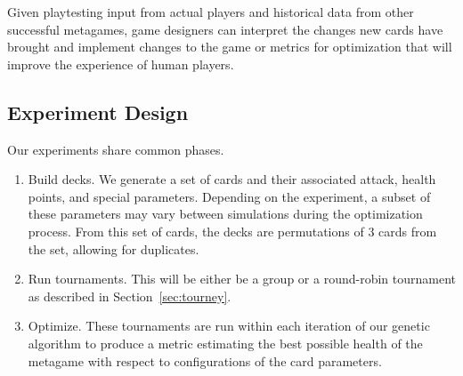 Given playtesting input from actual players and historical data from other successful metagames, game designers can interpret the %
changes new cards have brought and implement changes to the game or metrics for optimization that will improve the experience of human players.

\subsection{Experiment Design}


Our experiments share common phases.

\begin{enumerate}
	\item Build decks. We generate a set of cards and their associated attack, health points, and special parameters.
	Depending on the experiment, a subset of these parameters may vary between simulations during the optimization process.
	From this set of cards, the decks are permutations of 3 cards from the set, allowing for duplicates.
	\item Run tournaments. This will be either be a group or a round-robin tournament as described in Section~\ref{sec:tourney}.
	\item Optimize. These tournaments are run within each iteration of our genetic algorithm to produce a metric estimating the best
	possible health of the metagame with respect to configurations of the card parameters. %
\end{enumerate}
